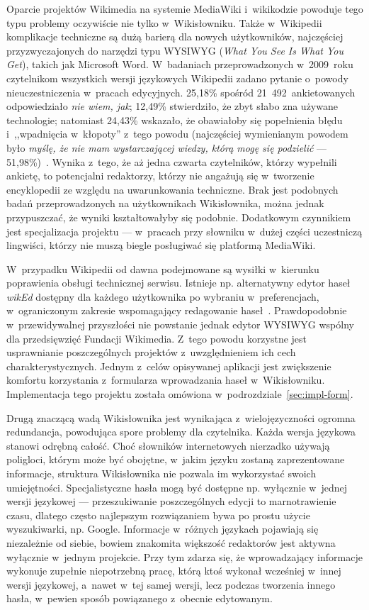 Oparcie projektów Wikimedia na systemie MediaWiki i~wikikodzie powoduje tego typu problemy oczywiście nie tylko w~Wikisłowniku. Także w~Wikipedii komplikacje techniczne są dużą barierą dla nowych użytkowników, najczęściej przyzwyczajonych do narzędzi typu WYSIWYG (\emph{What You See Is What You Get}), takich jak Microsoft Word. W~badaniach przeprowadzonych w~2009~roku czytelnikom wszystkich wersji językowych Wikipedii zadano pytanie o~powody nieuczestniczenia w~pracach edycyjnych. 25,18\% spośród 21~492~ankietowanych odpowiedziało \emph{nie wiem, jak}; 12,49\% stwierdziło, że zbyt słabo zna używane technologie; natomiast 24,43\% wskazało, że obawiałoby się popełnienia błędu i~,,wpadnięcia w~kłopoty'' z~tego powodu (najczęściej wymienianym powodem było \emph{myślę, że nie mam wystarczającej wiedzy, którą mogę się podzielić} --- 51,98\%)~\cite{wiki:survey}. Wynika z~tego, że aż jedna czwarta czytelników, którzy wypełnili ankietę, to potencjalni redaktorzy, którzy nie angażują się w~tworzenie encyklopedii ze względu na uwarunkowania techniczne. Brak jest podobnych badań przeprowadzonych na użytkownikach Wikisłownika, można jednak przypuszczać, że wyniki kształtowałyby się podobnie. Dodatkowym czynnikiem jest specjalizacja projektu --- w~pracach przy słowniku w~dużej części uczestniczą lingwiści, którzy nie muszą biegle posługiwać się platformą MediaWiki.

W~przypadku Wikipedii od dawna podejmowane są wysiłki w~kierunku poprawienia obsługi technicznej serwisu. Istnieje np. alternatywny edytor haseł \emph{wikEd} dostępny dla każdego użytkownika po wybraniu w~preferencjach, w~ograniczonym zakresie wspomagający redagowanie haseł~\cite{wiki:wiked}. Prawdopodobnie w~przewidywalnej przyszłości nie powstanie jednak edytor WYSIWYG wspólny dla przedsięwzięć Fundacji Wikimedia. Z~tego powodu korzystne jest usprawnianie poszczególnych projektów z~uwzględnieniem ich cech charakterystycznych. Jednym z~celów opisywanej aplikacji jest zwiększenie komfortu korzystania z~formularza wprowadzania haseł w~Wikisłowniku. Implementacja tego projektu została omówiona w~podrozdziale~\ref{sec:impl-form}.

Drugą znaczącą wadą Wikisłownika jest wynikająca z~wielojęzyczności ogromna redundancja, powodująca spore problemy dla czytelnika. Każda wersja językowa stanowi odrębną całość. Choć słowników internetowych nierzadko używają poligloci, którym może być obojętne, w~jakim języku zostaną zaprezentowane informacje, struktura Wikisłownika nie pozwala im wykorzystać swoich umiejętności. Specjalistyczne hasła mogą być dostępne np. wyłącznie w~jednej wersji językowej --- przeszukiwanie poszczególnych edycji to marnotrawienie czasu, dlatego często najlepszym rozwiązaniem bywa po prostu użycie wyszukiwarki, np. Google. Informacje w~różnych językach pojawiają się niezależnie od siebie, bowiem znakomita większość redaktorów jest aktywna wyłącznie w~jednym projekcie. Przy tym zdarza się, że wprowadzający informacje wykonuje zupełnie niepotrzebną pracę, którą ktoś wykonał wcześniej w~innej wersji językowej, a~nawet w~tej samej wersji, lecz podczas tworzenia innego hasła, w~pewien sposób powiązanego z~obecnie edytowanym.

